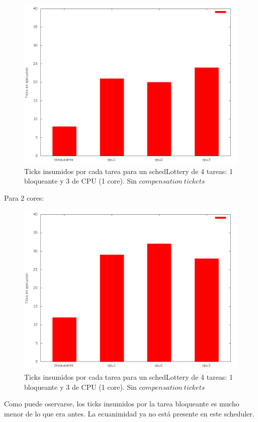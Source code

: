 \begin{figure}[!h]
	\begin{center}
		  \includegraphics[scale=0.3]{Graficos/sincomp1.png}
		  \caption{Ticks insumidos por cada tarea para un schedLottery de 4 tareas: 1 bloqueante y 3 de CPU (1 core). Sin $compensation \ tickets$}
		  \label{fig:contra1}
	\end{center}
\end{figure}
\FloatBarrier

Para 2 cores:

\begin{figure}[!h]
	\begin{center}
		  \includegraphics[scale=0.3]{Graficos/sinComp2.png}
		  \caption{Ticks insumidos por cada tarea para un schedLottery de 4 tareas: 1 bloqueante y 3 de CPU (1 core). Sin $compensation \ tickets$}
		  \label{fig:contra1}
	\end{center}
\end{figure}
\FloatBarrier

Como puede oservarse, los ticks insumidos por la tarea bloqueante es mucho menor de lo que era antes. La ecuanimidad ya no está presente en este scheduler.
